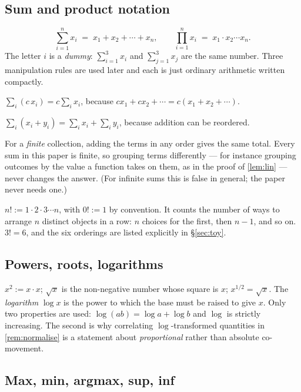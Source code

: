 \subsection{Sum and product notation}

\[
\sum_{i=1}^{n} x_i \;=\; x_1+x_2+\cdots+x_n,
\qquad
\prod_{i=1}^{n} x_i \;=\; x_1 \cdot x_2 \cdots x_n .
\]
The letter $i$ is a \emph{dummy}: $\sum_{i=1}^{3}x_i$ and $\sum_{j=1}^{3}x_j$ are
the same number. Three manipulation rules are used later and each is just
ordinary arithmetic written compactly.

$\sum_i (c\,x_i) = c\sum_i x_i$, because $cx_1+cx_2+\cdots = c(x_1+x_2+\cdots)$.

$\sum_i (x_i+y_i) = \sum_i x_i + \sum_i y_i$, because addition can be reordered.

 For a \emph{finite}
collection, adding the terms in any order gives the same total. Every sum in this
paper is finite, so grouping terms differently --- for instance grouping outcomes
by the value a function takes on them, as in the proof of \cref{lem:lin} --- never
changes the answer. (For infinite sums this is false in general; the paper never
needs one.)

\begin{definition}[Factorial]
$n! := 1\cdot 2\cdot 3 \cdots n$, with $0!:=1$ by convention. It counts the number
of ways to arrange $n$ distinct objects in a row: $n$ choices for the first, then
$n-1$, and so on. $3!=6$, and the six orderings are listed explicitly in
§\ref{sec:toy}.
\end{definition}

\subsection{Powers, roots, logarithms}

$x^2 := x\cdot x$; $\sqrt{x}$ is the non-negative number whose square is $x$;
$x^{1/2}=\sqrt x$. The \emph{logarithm} $\log x$ is the power to which the base
must be raised to give $x$. Only two properties are used:
$\log(ab)=\log a+\log b$ and $\log$ is strictly increasing. The second is why
correlating $\log$-transformed quantities in \cref{rem:normalise} is a statement
about \emph{proportional} rather than absolute co-movement.

\subsection{Max, min, argmax, sup, inf}

